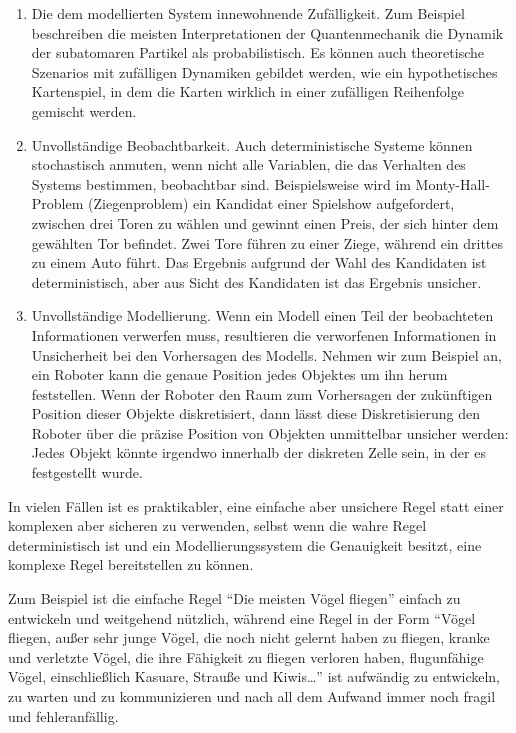 \begin{enumerate}

\item Die dem modellierten System innewohnende Zufälligkeit. Zum Beispiel beschreiben die meisten Interpretationen der Quantenmechanik die Dynamik der subatomaren Partikel als probabilistisch. Es können auch theoretische Szenarios mit zufälligen Dynamiken gebildet werden, wie ein hypothetisches Kartenspiel, in dem die Karten wirklich in einer zufälligen Reihenfolge gemischt werden.

\item Unvollständige Beobachtbarkeit. Auch deterministische Systeme können stochastisch anmuten, wenn nicht alle Variablen, die das Verhalten des Systems bestimmen, beobachtbar sind.  Beispielsweise wird im Monty-Hall-Problem (Ziegenproblem) ein Kandidat einer Spielshow aufgefordert, zwischen drei Toren zu wählen und gewinnt einen Preis, der sich hinter dem gewählten Tor befindet. Zwei Tore führen zu einer Ziege, während ein drittes zu einem Auto führt. Das Ergebnis aufgrund der Wahl des Kandidaten ist deterministisch, aber aus Sicht des Kandidaten ist das Ergebnis unsicher.

\item Unvollständige Modellierung. Wenn ein Modell einen Teil der beobachteten Informationen verwerfen muss, resultieren die verworfenen Informationen in Unsicherheit bei den Vorhersagen des Modells. Nehmen wir zum Beispiel an, ein Roboter kann die genaue Position jedes Objektes um ihn herum feststellen. Wenn der Roboter den Raum zum Vorhersagen der zukünftigen Position dieser Objekte diskretisiert, dann lässt diese Diskretisierung den Roboter über die präzise Position von Objekten unmittelbar unsicher werden: Jedes Objekt könnte irgendwo innerhalb der diskreten Zelle sein, in der es festgestellt wurde.

\end{enumerate}

In vielen Fällen ist es praktikabler, eine einfache aber unsichere Regel statt einer komplexen aber sicheren zu verwenden, selbst wenn die wahre Regel deterministisch ist und ein Modellierungssystem die Genauigkeit besitzt, eine komplexe Regel bereitstellen zu können.

Zum Beispiel ist die einfache Regel ``Die meisten Vögel fliegen'' einfach zu entwickeln und weitgehend nützlich, während eine Regel in der Form ``Vögel fliegen, außer sehr junge Vögel, die noch nicht gelernt haben zu fliegen, kranke und verletzte Vögel, die ihre Fähigkeit zu fliegen verloren haben, flugunfähige Vögel, einschließlich Kasuare, Strauße und Kiwis\dots'' ist aufwändig zu entwickeln, zu warten und zu kommunizieren und nach all dem Aufwand immer noch fragil und fehleranfällig.


